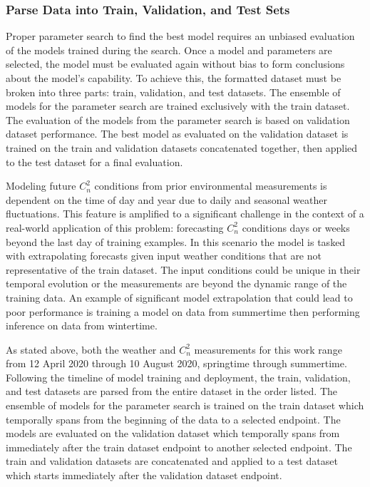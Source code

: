 \subsubsection{Parse Data into Train, Validation, and Test Sets}
Proper parameter search to find the best model requires an unbiased evaluation of the models trained during the search. Once a model and parameters are selected, the model must be evaluated again without bias to form conclusions about the model's capability. To achieve this, the formatted dataset must be broken into three parts: train, validation, and test datasets. The ensemble of models for the parameter search are trained exclusively with the train dataset. The evaluation of the models from the parameter search is based on validation dataset performance. The best model as evaluated on the validation dataset is trained on the train and validation datasets concatenated together, then applied to the test dataset for a final evaluation.

Modeling future $C_{n}^{2}$ conditions from prior environmental measurements is dependent on the time of day and year due to daily and seasonal weather fluctuations. This feature is amplified to a significant challenge in the context of a real-world application of this problem: forecasting $C_{n}^{2}$ conditions days or weeks beyond the last day of training examples. In this scenario the model is tasked with extrapolating forecasts given input weather conditions that are not representative of the train dataset. The input conditions could be unique in their temporal evolution or the measurements are beyond the dynamic range of the training data. An example of significant model extrapolation that could lead to poor performance is training a model on data from summertime then performing inference on data from wintertime.

As stated above, both the weather and $C_{n}^{2}$ measurements for this work range from 12 April 2020 through 10 August 2020, springtime through summertime. Following the timeline of model training and deployment, the train, validation, and test datasets are parsed from the entire dataset in the order listed. The ensemble of models for the parameter search is trained on the train dataset which temporally spans from the beginning of the data to a selected endpoint. The models are evaluated on the validation dataset which temporally spans from immediately after the train dataset endpoint to another selected endpoint. The train and validation datasets are concatenated and applied to a test dataset which starts immediately after the validation dataset endpoint.

